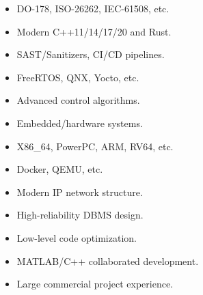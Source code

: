 \documentclass[10pt,a4paper,ragged2e,withhyper]{altacv}
\begin{document}
\begin{paracol}{2}
    \begin{itemize}
    \item DO-178, ISO-26262, IEC-61508, etc.
    \smallskip
    \item Modern C++11/14/17/20 and Rust.
    \smallskip
    \item SAST/Sanitizers, CI/CD pipelines.
    \smallskip
    \item FreeRTOS, QNX, Yocto, etc.
    \smallskip
    \item Advanced control algorithms.
    \smallskip
    \item Embedded/hardware systems.
    \smallskip
    \item X86\_64, PowerPC, ARM, RV64, etc.
    \smallskip
    \item Docker, QEMU, etc.
    \smallskip
    \item Modern IP network structure.
    \smallskip
    \item High-reliability DBMS design.
    \smallskip
    \item Low-level code optimization.
    \smallskip
    \item MATLAB/C++ collaborated development.
    \smallskip
    \item Large commercial project experience.
    \end{itemize}



\end{paracol}
\end{document}
